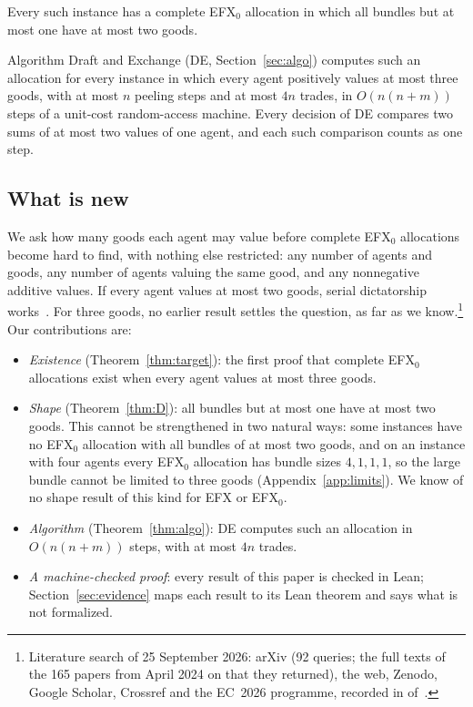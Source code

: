 \documentclass[runningheads,11pt]{llncs}
\newcommand{\efxz}{\texorpdfstring{\mbox{EFX$_0$}}{EFX0}}
\newcommand{\DE}{\textup{DE}}
\begin{document}
\begin{theorem}\label{thm:D}
Every such instance has a complete \efxz{} allocation in which all bundles but at most one have at most two goods.
\end{theorem}

\begin{theorem}[algorithm]\label{thm:algo}
Algorithm Draft and Exchange (\DE{}, Section~\ref{sec:algo}) computes such an allocation for every instance in which every agent positively values at most three goods, with at most $n$ peeling steps and at most $4n$ trades, in $O(n(n+m))$ steps of a unit-cost random-access machine. Every decision of \DE{} compares two sums of at most two values of one agent, and each such comparison counts as one step.
\end{theorem}

\subsection{What is new}\label{sec:new}

We ask how many goods each agent may value before complete \efxz{} allocations become hard to find, with nothing else restricted: any number of agents and goods, any number of agents valuing the same good, and any nonnegative additive values. If every agent values at most two goods, serial dictatorship works~\cite{MrdEfx}. For three goods, no earlier result settles the question, as far as we know.\footnote{Literature search of 25 September 2026: arXiv (92 queries; the full texts of the 165 papers from April 2024 on that they returned), the web, Zenodo, Google Scholar, Crossref and the EC~2026 programme, recorded in  of~\cite{Repo}.} Our contributions are:
\begin{itemize}
\item \emph{Existence} (Theorem~\ref{thm:target}): the first proof that complete \efxz{} allocations exist when every agent values at most three goods.
\item \emph{Shape} (Theorem~\ref{thm:D}): all bundles but at most one have at most two goods. This cannot be strengthened in two natural ways: some instances have no \efxz{} allocation with all bundles of at most two goods, and on an instance with four agents every \efxz{} allocation has bundle sizes $4,1,1,1$, so the large bundle cannot be limited to three goods (Appendix~\ref{app:limits}). We know of no shape result of this kind for EFX or \efxz{}.
\item \emph{Algorithm} (Theorem~\ref{thm:algo}): \DE{} computes such an allocation in $O(n(n+m))$ steps, with at most $4n$ trades.
\item \emph{A machine-checked proof}: every result of this paper is checked in Lean; Section~\ref{sec:evidence} maps each result to its Lean theorem and says what is not formalized.
\end{itemize}
\end{document}
